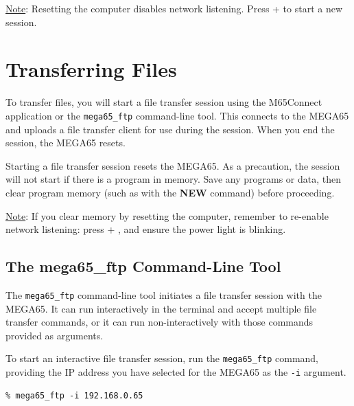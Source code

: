 \underline{Note}: Resetting the computer disables network listening. Press  + \megakey{\pounds} to start a new session.

\section{Transferring Files}

To transfer files, you will start a file transfer session using the M65Connect application or the {\tt mega65\_ftp} command-line tool. This connects to the MEGA65 and uploads a file transfer client for use during the session. When you end the session, the MEGA65 resets.

Starting a file transfer session resets the MEGA65. As a precaution, the session will not start if there is a program in memory. Save any programs or data, then clear program memory (such as with the {\bf NEW} command) before proceeding.

\underline{Note}: If you clear memory by resetting the computer, remember to re-enable network listening: press  + \megakey{\pounds}, and ensure the power light is blinking.


\subsection{The mega65\_ftp Command-Line Tool}

The {\tt mega65\_ftp} command-line tool initiates a file transfer session with the MEGA65. It can run interactively in the terminal and accept multiple file transfer commands, or it can run non-interactively with those commands provided as arguments.


To start an interactive file transfer session, run the {\tt mega65\_ftp} command, providing the IP address you have selected for the MEGA65 as the {\tt -i} argument.

\begin{verbatim}
% mega65_ftp -i 192.168.0.65
\end{verbatim}


